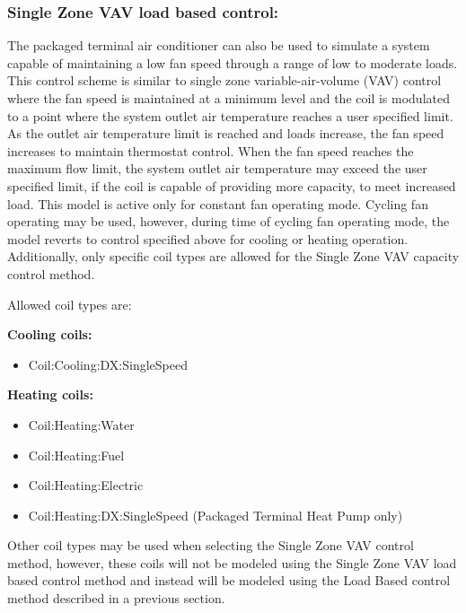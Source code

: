 \subsubsection{Single Zone VAV load based control:}\label{single-zone-vav-load-based-control}

The packaged terminal air conditioner can also be used to simulate a system capable of maintaining a low fan speed through a range of low to moderate loads. This control scheme is similar to single zone variable-air-volume (VAV) control where the fan speed is maintained at a minimum level and the coil is modulated to a point where the system outlet air temperature reaches a user specified limit. As the outlet air temperature limit is reached and loads increase, the fan speed increases to maintain thermostat control. When the fan speed reaches the maximum flow limit, the system outlet air temperature may exceed the user specified limit, if the coil is capable of providing more capacity, to meet increased load. This model is active only for constant fan operating mode. Cycling fan operating may be used, however, during time of cycling fan operating mode, the model reverts to control specified above for cooling or heating operation. Additionally, only specific coil types are allowed for the Single Zone VAV capacity control method.

Allowed coil types are:

\textbf{Cooling coils:}
\begin{itemize}
\item Coil:Cooling:DX:SingleSpeed
\end{itemize}

\textbf{Heating coils:}
\begin{itemize}
\item Coil:Heating:Water
\item Coil:Heating:Fuel
\item Coil:Heating:Electric
\item Coil:Heating:DX:SingleSpeed (Packaged Terminal Heat Pump only)
\end{itemize}

Other coil types may be used when selecting the Single Zone VAV control method, however, these coils will not be modeled using the Single Zone VAV load based control method and instead will be modeled using the Load Based control method described in a previous section.

